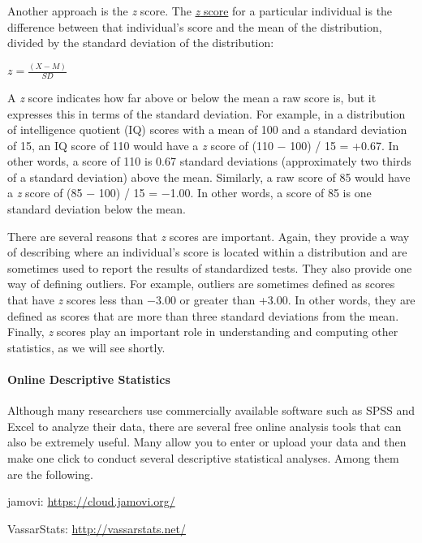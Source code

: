 \documentclass[
]{krantz}
\begin{document}
Another approach is the \emph{z} score. The \protect\hyperlink{z-score}{\emph{z} score} for a particular individual is the difference between that individual's score and the mean of the distribution, divided by the standard deviation of the distribution:

\(z=\frac{(X-M)}{SD}\)

A \emph{z} score indicates how far above or below the mean a raw score is, but it expresses this in terms of the standard deviation. For example, in a distribution of intelligence quotient (IQ) scores with a mean of 100 and a standard deviation of 15, an IQ score of 110 would have a \emph{z} score of (110 − 100) / 15 = +0.67. In other words, a score of 110 is 0.67 standard deviations (approximately two thirds of a standard deviation) above the mean. Similarly, a raw score of 85 would have a \emph{z} score of (85 − 100) / 15 = −1.00. In other words, a score of 85 is one standard deviation below the mean.

There are several reasons that \emph{z} scores are important. Again, they provide a way of describing where an individual's score is located within a distribution and are sometimes used to report the results of standardized tests. They also provide one way of defining outliers. For example, outliers are sometimes defined as scores that have \emph{z} scores less than −3.00 or greater than +3.00. In other words, they are defined as scores that are more than three standard deviations from the mean. Finally, \emph{z} scores play an important role in understanding and computing other statistics, as we will see shortly.

\hypertarget{online-descriptive-statistics}{%
\paragraph*{Online Descriptive Statistics}\label{online-descriptive-statistics}}

Although many researchers use commercially available software such as SPSS and Excel to analyze their data, there are several free online analysis tools that can also be extremely useful. Many allow you to enter or upload your data and then make one click to conduct several descriptive statistical analyses. Among them are the following.

jamovi: \url{https://cloud.jamovi.org/}

VassarStats: \url{http://vassarstats.net/}
\end{document}
